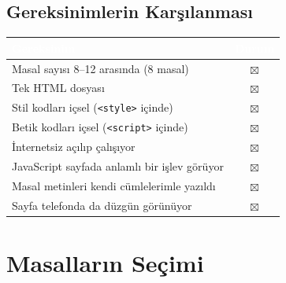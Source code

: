 \documentclass[12pt,a4paper]{article}
\begin{document}
\subsection{Gereksinimlerin Karşılanması}
\begin{center}
\begin{tabular}{@{}p{8.2cm}c@{}}
\toprule
\rowcolor{ana}\textcolor{white}{\textbf{Gereksinim}} & \textcolor{white}{\textbf{Durum}} \\
\midrule
Masal sayısı 8--12 arasında (8 masal)         & $\boxtimes$ \\
Tek HTML dosyası                                    & $\boxtimes$ \\
Stil kodları içsel (\texttt{<style>} içinde)        & $\boxtimes$ \\
Betik kodları içsel (\texttt{<script>} içinde)      & $\boxtimes$ \\
İnternetsiz açılıp çalışıyor                        & $\boxtimes$ \\
JavaScript sayfada anlamlı bir işlev görüyor        & $\boxtimes$ \\
Masal metinleri kendi cümlelerimle yazıldı          & $\boxtimes$ \\
Sayfa telefonda da düzgün görünüyor                 & $\boxtimes$ \\
\bottomrule
\end{tabular}
\end{center}

\section{Masalların Seçimi}
\end{document}
